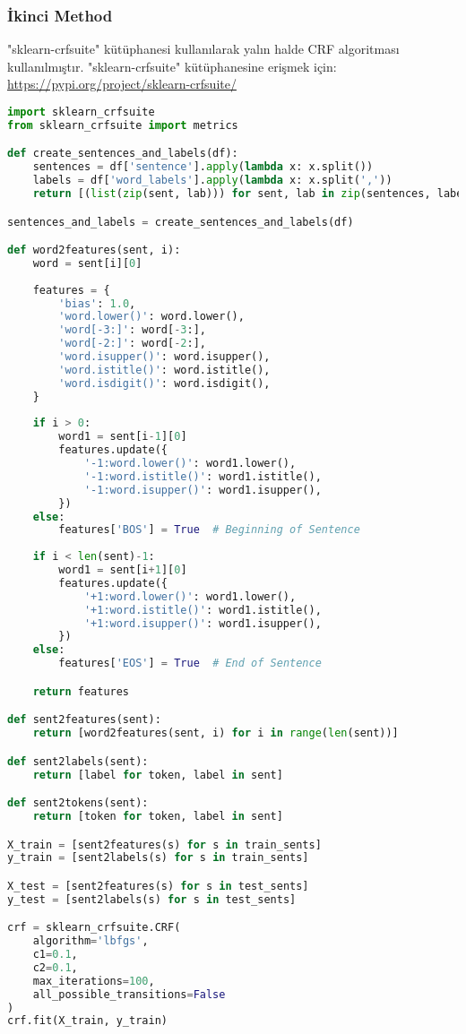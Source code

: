 \subsubsection{İkinci Method}

"sklearn-crfsuite" kütüphanesi kullanılarak yalın halde CRF algoritması kullanılmıştır. "sklearn-crfsuite" kütüphanesine erişmek için: \url{https://pypi.org/project/sklearn-crfsuite/}

\begin{lstlisting}[language=Python]
import sklearn_crfsuite
from sklearn_crfsuite import metrics

def create_sentences_and_labels(df):
    sentences = df['sentence'].apply(lambda x: x.split())
    labels = df['word_labels'].apply(lambda x: x.split(','))
    return [(list(zip(sent, lab))) for sent, lab in zip(sentences, labels)]

sentences_and_labels = create_sentences_and_labels(df)

def word2features(sent, i):
    word = sent[i][0]
    
    features = {
        'bias': 1.0,
        'word.lower()': word.lower(),
        'word[-3:]': word[-3:],
        'word[-2:]': word[-2:],
        'word.isupper()': word.isupper(),
        'word.istitle()': word.istitle(),
        'word.isdigit()': word.isdigit(),
    }
    
    if i > 0:
        word1 = sent[i-1][0]
        features.update({
            '-1:word.lower()': word1.lower(),
            '-1:word.istitle()': word1.istitle(),
            '-1:word.isupper()': word1.isupper(),
        })
    else:
        features['BOS'] = True  # Beginning of Sentence
    
    if i < len(sent)-1:
        word1 = sent[i+1][0]
        features.update({
            '+1:word.lower()': word1.lower(),
            '+1:word.istitle()': word1.istitle(),
            '+1:word.isupper()': word1.isupper(),
        })
    else:
        features['EOS'] = True  # End of Sentence

    return features

def sent2features(sent):
    return [word2features(sent, i) for i in range(len(sent))]

def sent2labels(sent):
    return [label for token, label in sent]

def sent2tokens(sent):
    return [token for token, label in sent]

X_train = [sent2features(s) for s in train_sents]
y_train = [sent2labels(s) for s in train_sents]

X_test = [sent2features(s) for s in test_sents]
y_test = [sent2labels(s) for s in test_sents]

crf = sklearn_crfsuite.CRF(
    algorithm='lbfgs',
    c1=0.1,
    c2=0.1,
    max_iterations=100,
    all_possible_transitions=False
)
crf.fit(X_train, y_train)
\end{lstlisting}

\newpage